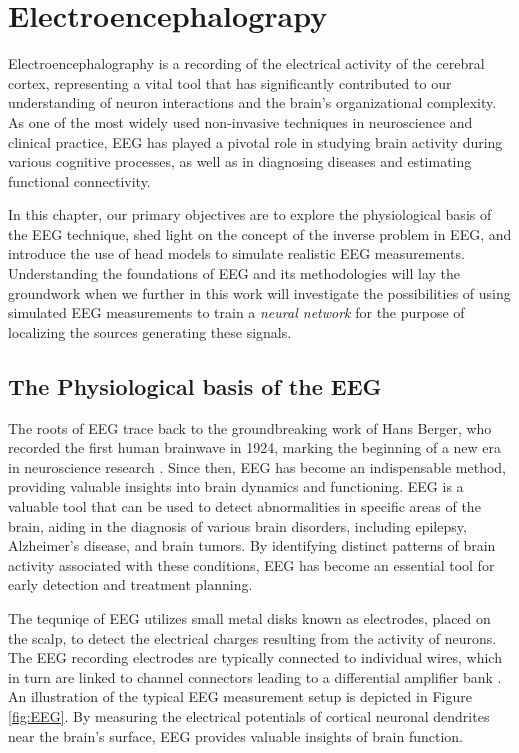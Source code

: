 \documentclass[a4paper, UKenglish, 11pt]{uiomaster}
\begin{document}
\chapter{Electroencephalograpy}
Electroencephalography is a recording of the electrical activity of the cerebral cortex, representing a vital tool that has significantly contributed to our understanding of neuron interactions and the brain's organizational complexity. As one of the most widely used non-invasive techniques in neuroscience and clinical practice, EEG has played a pivotal role in studying brain activity during various cognitive processes, as well as in diagnosing diseases and estimating functional connectivity.

In this chapter, our primary objectives are to explore the physiological basis of the EEG technique, shed light on the concept of the inverse problem in EEG, and introduce the use of head models to simulate realistic EEG measurements. Understanding the foundations of EEG and its methodologies will lay the groundwork when we further in this work will investigate the possibilities of using simulated EEG measurements to train a \emph{neural network} for the purpose of localizing the sources generating these signals.

\section{The Physiological basis of the EEG}
The roots of EEG trace back to the groundbreaking work of Hans Berger, who recorded the first human brainwave in 1924, marking the beginning of a new era in neuroscience research \cite{wiki:electroencephalography}. Since then, EEG has become an indispensable method, providing valuable insights into brain dynamics and functioning. EEG is a valuable tool that can be used to detect abnormalities in specific areas of the brain, aiding in the diagnosis of various brain disorders, including epilepsy, Alzheimer's disease, and brain tumors. By identifying distinct patterns of brain activity associated with these conditions, EEG has become an essential tool for early detection and treatment planning.

The tequniqe of EEG utilizes small metal disks known as electrodes, placed on the scalp, to detect the electrical charges resulting from the activity of neurons. The EEG recording electrodes are typically connected to individual wires, which in turn are linked to channel connectors leading to a differential amplifier bank . An illustration of the typical EEG measurement setup is depicted in Figure \ref{fig:EEG}. By measuring the electrical potentials of cortical neuronal dendrites near the brain's surface, EEG provides valuable insights of brain function.
\end{document}
